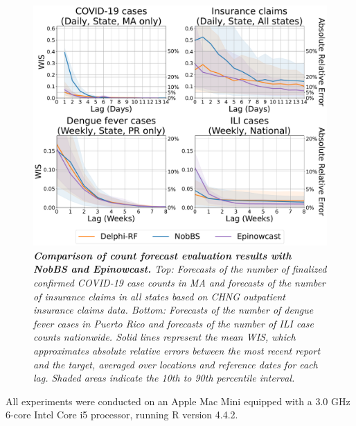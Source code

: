 \begin{figure}[h!]
    \centering
    \includegraphics[width=\textwidth]{figs/experiment_count_result_evl_general_for_comparison.pdf}
   \caption{\emph{\textbf{Comparison of count forecast evaluation results with NobBS and Epinowcast.} Top: Forecasts of the number of finalized confirmed COVID-19 case counts in MA and forecasts of the number of insurance claims in all states based on CHNG outpatient insurance claims data. Bottom: Forecasts of the number of dengue fever cases in Puerto Rico and forecasts of the number of ILI case counts nationwide. Solid lines represent the mean WIS, which approximates absolute relative errors between the most recent report and the target, averaged over locations and reference dates for each lag. Shaded areas indicate the 10th to 90th percentile interval.}}

\end{figure}

All experiments were conducted on an Apple Mac Mini equipped with a 3.0 GHz 6-core Intel Core i5 processor, running R version 4.4.2.

